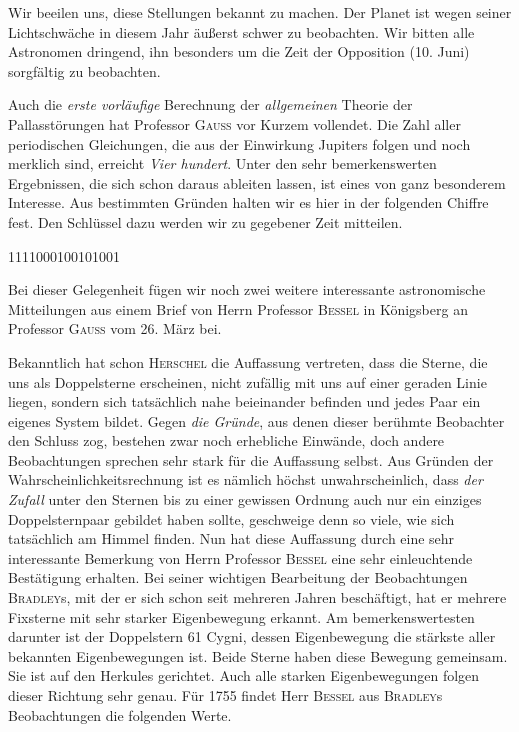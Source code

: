 \par\indent Wir beeilen uns, diese Stellungen bekannt zu machen. Der Planet ist wegen seiner Lichtschwäche in diesem Jahr äußerst schwer zu beobachten. Wir bitten alle Astronomen dringend, ihn besonders um die Zeit der Opposition (10. Juni) sorgfältig zu beobachten.

\par\indent Auch die \emph{erste vorläufige} Berechnung der \emph{allgemeinen} Theorie der Pallasstörungen hat Professor \textsc{Gauß} vor Kurzem vollendet. Die Zahl aller periodischen Gleichungen, die aus der Einwirkung Jupiters folgen und noch merklich sind, erreicht \emph{Vier hundert}. Unter den sehr bemerkenswerten Ergebnissen, die sich schon daraus ableiten lassen, ist eines von ganz besonderem Interesse. Aus bestimmten Gründen halten wir es hier in der folgenden Chiffre fest. Den Schlüssel dazu werden wir zu gegebener Zeit mitteilen.

\begin{center}
1111000100101001
\end{center}

\par\indent Bei dieser Gelegenheit fügen wir noch zwei weitere interessante astronomische Mitteilungen aus einem Brief von Herrn Professor \textsc{Bessel} in Königsberg an Professor \textsc{Gauß} vom 26. März bei.

\par\indent Bekanntlich hat schon \textsc{Herschel} die Auffassung vertreten, dass die Sterne, die uns als Doppelsterne erscheinen, nicht zufällig mit uns auf einer geraden Linie liegen, sondern sich tatsächlich nahe beieinander befinden und jedes Paar ein eigenes System bildet. Gegen \emph{die Gründe}, aus denen dieser berühmte Beobachter den Schluss zog, bestehen zwar noch erhebliche Einwände, doch andere Beobachtungen sprechen sehr stark für die Auffassung selbst. Aus Gründen der Wahrscheinlichkeitsrechnung ist es nämlich höchst unwahrscheinlich, dass \emph{der Zufall} unter den Sternen bis zu einer gewissen Ordnung auch nur ein einziges Doppelsternpaar gebildet haben sollte, geschweige denn so viele, wie sich tatsächlich am Himmel finden. Nun hat diese Auffassung durch eine sehr interessante Bemerkung von Herrn Professor \textsc{Bessel} eine sehr einleuchtende Bestätigung erhalten. Bei seiner wichtigen Bearbeitung der Beobachtungen \textsc{Bradley}s, mit der er sich schon seit mehreren Jahren beschäftigt, hat er mehrere Fixsterne mit sehr starker Eigenbewegung erkannt. Am bemerkenswertesten darunter ist der Doppelstern 61 Cygni, dessen Eigenbewegung die stärkste aller bekannten Eigenbewegungen ist. Beide Sterne haben diese Bewegung gemeinsam. Sie ist auf den Herkules gerichtet. Auch alle starken Eigenbewegungen folgen dieser Richtung sehr genau. Für 1755 findet Herr \textsc{Bessel} aus \textsc{Bradley}s Beobachtungen die folgenden Werte.

